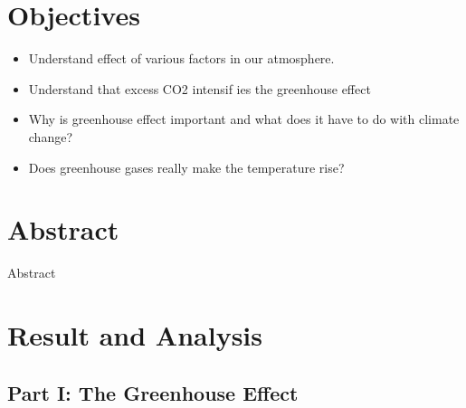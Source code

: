 \documentclass[a4paper, 12pt, english]{article}
\begin{document}


\newpage
\section{Objectives}
\begin{itemize}
	\item Understand effect of various factors in our atmosphere.
	\item Understand that excess CO2 intensif ies the greenhouse effect
	\item Why is greenhouse effect important and what does it have to do with climate
	      change?
	\item Does greenhouse gases really make the temperature rise?
\end{itemize}
\section{Abstract}
Abstract

\section{Result and Analysis}
\subsection{Part I: The Greenhouse Effect}
\end{document}
